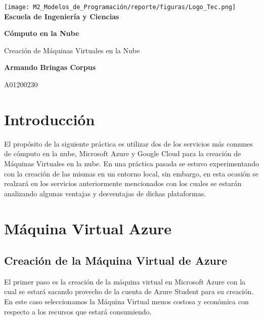\documentclass[12pt,a4paper]{article}
\begin{document}
\begin{titlepage}
    \centering
    \texttt{[image: M2\_Modelos\_de\_Programación/reporte/figuras/Logo\_Tec.png]}\\
    \vspace{.5cm}
    \bfseries\large Escuela de Ingeniería y Ciencias
        
    \vspace{5cm}
    \centering
    \textbf{\Huge Cómputo en la Nube}
    \vspace{0.5cm}
        
    {\Large Creación de Máquinas Virtuales en la Nube}

    \vspace{5cm}
        
    \textbf{\LARGE Armando Bringas Corpus}
        
    \vspace{0.5cm}
        
    {\large A01200230}
        
    \vfill
        
\end{titlepage}

\section{Introducción}

El propósito de la siguiente práctica es utilizar dos de los servicios más comunes de cómputo en la nube, Microsoft Azure y Google Cloud para la creación de Máquinas Virtuales en la nube. En una práctica pasada se estuvo experimentando con la creación de las mismas en un entorno local, sin embargo, en esta ocasión se realzará en los servicios anteriormente mencionados con los cuales se estarán analizando algunas ventajas y desventajas de dichas plataformas.

\section{Máquina Virtual Azure}

\subsection{Creación de la Máquina Virtual de Azure}

El primer paso es la creación de la máquina virtual en Microsoft Azure con la cual se estará sacando provecho de la cuenta de Azure Student para su creación. En este caso seleccionamos la Máquina Virtual menos costosa y económica con respecto a los recursos que estará consumiendo.
\end{document}
